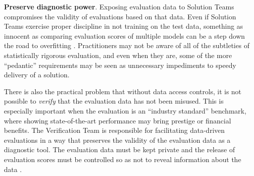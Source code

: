 \textbf{Preserve diagnostic power}. Exposing evaluation data to Solution Teams compromises the validity of evaluations based on that data. Even if Solution Teams exercise proper discipline in not training on the test data, something as innocent as comparing evaluation scores of multiple models can be a step down the road to overfitting \cite{blum_ladder_2015}. Practitioners may not be aware of all of the subtleties of statistically rigorous evaluation, and even when they are, some of the more ``pedantic'' requirements may be seen as unnecessary impediments to speedy delivery of a solution. 

There is also the practical problem that without data access controls, it is not possible to \emph{verify} that the evaluation data has not been misused. This is especially important when the evaluation is an ``industry standard'' benchmark, where showing state-of-the-art performance may bring prestige or financial benefits. The Verification Team is responsible for facilitating data-driven evaluations in a way that preserves the validity of the evaluation data as a diagnostic tool. The evaluation data must be kept private and the release of evaluation scores must be controlled so as not to reveal information about the data \cite{blum_ladder_2015}.



